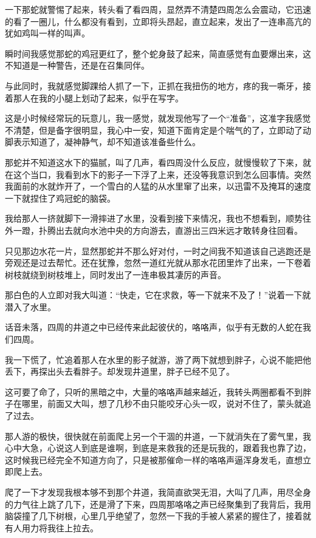 一下那蛇就警惕了起来，转头看了看四周，显然弄不清楚四周怎么会震动，它迅速的看了一圈儿，什么都没有看到，立即将头昂起，直立起来，发出了一连串高亢的犹如鸡叫一样的叫声。

瞬时间我感觉那蛇的鸡冠更红了，整个蛇身鼓了起来，简直感觉有血要爆出来，这不知道是一种警告，还是在召集同伴。

与此同时，我就感觉脚踝给人抓了一下，正抓在我扭伤的地方，疼的我一嘶牙，接着那人在我的小腿上划动了起来，似乎在写字。

这是小时候经常玩的玩意儿，我一感觉，就发现他写了一个“准备”，这准字我感觉不清楚，但是备字很明显，我心中一安，知道下面肯定是个喘气的了，立即动了动脚表示知道了，凝神静气，却不知道该准备些什么。

那蛇并不知道这水下的猫腻，叫了几声，看四周没什么反应，就慢慢软了下来，就在这个当口，我看到水下的影子一下浮了上来，还没等我意识到怎么回事情。突然我面前的水就炸开了，一个雪白的人猛的从水里窜了出来，以迅雷不及掩耳的速度一下就捏住了鸡冠蛇的脑袋。

我给那人一挤就脚下一滑摔进了水里，没看到接下来情况，我也不想看到，顺势往外一蹬，扑腾出去就向水池中央的方向游去，直游出三四米远才敢转身往回看。

只见那边水花一片，显然那蛇并不那么好对付，一时之间我不知道该自己逃跑还是旁观还是过去帮忙。还在犹豫，忽然一道红光就从那水花团里炸了出来，一下卷着树枝就绕到树枝堆上，同时发出了一连串极其凄厉的声音。

那白色的人立即对我大叫道：“快走，它在求救，等一下就来不及了！”说着一下就潜入了水里。

话音未落，四周的井道之中已经传来此起彼伏的，咯咯声，似乎有无数的人蛇在我们四周。

我一下慌了，忙追着那人在水里的影子就游，游了两下就想到胖子，心说不能把他丢下，再探出头去看胖子。却发现井道里，胖子已经不见了。

这可要了命了，只听的黑暗之中，大量的咯咯声越来越近，我转头两圈都看不到胖子在哪里，前面又大叫，想了几秒不由只能咬牙心头一叹，说对不住了，蒙头就追了过去。

那人游的极快，很快就在前面爬上另一个干涸的井道，一下就消失在了雾气里，我心中大急，心说这人到底是谁啊，到底是来救我的还是玩我的，跟着我也靠了边，这时候我已经完全不知道方向了，只是被那催命一样的咯咯声逼浑身发毛，直想立即爬上去。

爬了一下才发现我根本够不到那个井道，我简直欲哭无泪，大叫了几声，用尽全身的力气往上跳了几下，还是滑了下来，四周那咯咯之声已经聚集到了我背后，我用脑袋撞了几下树根，心里几乎绝望了，忽然一下我的手被人紧紧的握住了，接着就有人用力将我往上拉去。


